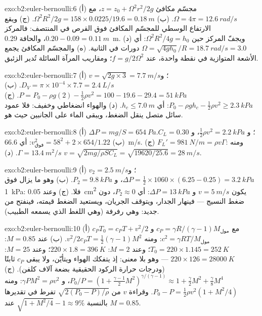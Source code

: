 \begin{solution}{exo:b2:euler-bernoulli:6}
(أ) مجسّم مكافئ $z = z_0 + \Omega^2r^2/2g$، مع $\Omega = 4\pi = \qty{12.6}{rad/s}$. (ب)
$\Omega^2R^2/2g = 158 \times 0.0225/19.6 = \qty{0.18}{m}$. (ج) ويقع الارتفاع الوسطي
للمجسّم المكافئ فوق القرص في المنتصف: فالمركز $0.20 - 0.09 = \qty{0.11}{m}$، والحافة
\qty{0.29}{m}. (د) ويجفّ المركز حين $\Omega^2R^2/4g = h_0$: أي $\Omega = \sqrt{4gh_0}/R =
\qty{18.7}{rad/s} = 3.0$ دورات في الثانية. (ه) والمجسّم المكافئ يجمع
الأشعة المتوازية في نقطة واحدة، عند $f = g/2\Omega^2$؛ ومقاريب المرآة
السائلة تُدير الزئبق.
\end{solution}

\begin{solution}{exo:b2:euler-bernoulli:7}
(أ) $v = \sqrt{2g \times 3} = \qty{7.7}{m/s}$؛ و $D_V = \pi \times 10^{-4} \times 7.7 =
\qty{2.4}{L/s}$. (ب) $P = P_0 - \rho g(2) - \tfrac12\rho v^2 = 100 - 19.6 - 29.4 =
\qty{51}{kPa}$. (ج) $P_0 - \rho gh_c - \tfrac12\rho v^2 \ge \qty{2.3}{kPa}$: أي $h_c \le
\qty{7.0}{m}$. (د) والهواء انضغاطي وخفيف: فلا عمود سائل متصل ينقل
الضغط، ويبقى الماء على الجانبين حيث هو.
\end{solution}

\begin{solution}{exo:b2:euler-bernoulli:8}
(أ) $\Delta P = mg/S = \qty{654}{Pa}$؛ و $\tfrac12\rho v^2 = \qty{2.2}{kPa}$، و $C_L = 0.30$.
(ب) $v_{\text{فوق}}^2 = 58^2 + 2 \times 654/1.22$: أي \qty{66.6}{m/s}. (ج) $F_L' =
\qty{981}{N/m} = \rho v\Gamma$: ومنه $\Gamma = \qty{13.4}{m^2/s}$. (د) $v = \sqrt{2mg/
\rho SC_L} = \sqrt{19620/25.6} = \qty{28}{m/s}$.
\end{solution}

\begin{solution}{exo:b2:euler-bernoulli:9}
(أ) $v_2 = \qty{2.5}{m/s}$؛ و $\Delta P = \tfrac12 \times 1060 \times (6.25 - 0.25) =
\qty{3.2}{kPa}$، و $P_2 = \qty{9.8}{kPa}$. (ب) وهو ما يزال فوق \qty{1}{kPa}: فلا. (ج) وعند
\qty{0.05}{cm^2} يكون $v = \qty{5}{m/s}$ و $\Delta P = \qty{13}{kPa}$: أي $P_2 \approx 0$، دون
ضغط النسيج --- فينهار الجدار، ويتوقف الجريان، ويستعيد
الضغط قيمته، فينفتح من جديد: وهي رفرفة (وهي اللغط الذي يسمعه الطبيب).
\end{solution}

\begin{solution}{exo:b2:euler-bernoulli:10}
(أ) $c_PT_0 = c_PT + v^2/2$ مع $c_P = \gamma R/(\gamma - 1)M_{\text{مول}}$ و
$c^2 = \gamma RT/M_{\text{مول}}$: ومنه $v^2/2c_PT = \tfrac12(\gamma - 1)M^2$. (ب) عند $M =
0.85$: $T_0 = 220 \times 1.145 = \qty{252}{K}$؛ وعند $M = 2$: $220 \times 1.8 = \qty{396}{K}$؛
وعند $M = 25$: $220 \times 126 = \qty{28000}{K}$ --- وهو بلا معنى: إذ يتفكك الهواء
ويتأيّن، ولا يبقى $c_P$ ثابتًا (ودرجات حرارة الركود الحقيقية
بضعة آلاف كلفن). (ج) $P_0/P = (1 + \tfrac{\gamma - 1}2M^2)^{\gamma/(\gamma
- 1)} \approx 1 + \tfrac{\gamma}2M^2 + \tfrac{\gamma}8M^4$، و $\gamma PM^2 = \rho v^2$:
ومنه $P_0 - P = \tfrac12\rho v^2(1 + M^2/4)$. وقراءة $v$ من $\sqrt{2(P_0 - P)/\rho}$
تفرط في تقديرها بالنسبة $\sqrt{1 + M^2/4} - 1 \approx 9\%$ عند $M = 0.85$.
\end{solution}

